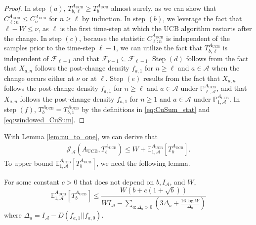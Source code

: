 \documentclass[letterpaper, 10 pt, conference]{ieeeconf}  %
\newcommand{\lp}{\left(}
\newcommand{\rp}{\right)}
\newcommand{\lb}{\left[}
\newcommand{\rb}{\right]}
\newcommand{\mcal}{\mathcal}
\newcommand{\mrm}{\mathrm}
\newcommand{\mbb}{\mathbb}
\newcommand{\E}{\mathbb{E}}
\begin{document}
\begin{proof}
%
In step $(a)$, $T_{b, \ell}^{A_{\mrm{UCB}}} \geq T_{b}^{A_{\mrm{UCB}}}$ almost surely, as we can show that $C_{\ell:n}^{A_{\mrm{UCB}}} \leq C_{n}^{A_{\mrm{UCB}}}$ for $n \geq \ell$ by induction. In step $(b)$, we leverage the fact that $ \ell - W \leq \nu$, as $\ell$ is the first time-step at which the UCB algorithm restarts after the change. In step $(c)$, because the statistic $C_{\ell:n}^{A_{\mrm{UCB}}}$ is independent of the samples prior to the time-step $\ell - 1$, we can utilize the fact that $T_{b, \ell}^{A_{\mrm{UCB}}}$ is independent of $\mcal{F}_{\ell - 1}$ and that $\mcal{F}_{\nu - 1} \subseteq \mcal{F}_{\ell - 1}$. Step $(d)$ follows from the fact that $X_{a,n}$ follows the post-change density $f_{a,1}$ for $n \geq \ell$ and $a \in \mcal{A}$ when the change occurs either at $\nu$ or at $\ell$. Step $(e)$ results from the fact that $X_{a,n}$ follows the post-change density $f_{a,1}$ for $n \geq \ell$ and $a \in \mcal{A}$ under $\mbb{P}_{\ell, \mcal{A}}^{A_{\mrm{UCB}}}$, and that $X_{a,n}$ follows the post-change density $f_{a,1}$ for $n \geq 1$ and $a \in \mcal{A}$ under $\mbb{P}_{1, \mcal{A}}^{A_{\mrm{UCB}}}$. In step $(f)$, $T_{b}^{A_{\mrm{UCB}}}=T_{b, 1}^{A_{\mrm{UCB}}}$ by the definitions in \eqref{eq:CuSum_stat} and \eqref{eq:windowed_CuSum}.
\end{proof}

With Lemma \ref{lem:nu_to_one}, we can derive that
%
\begin{align}
    \mcal{J}_{\mcal{A}} \lp A_{\mrm{UCB}}, T_{b}^{A_{\mrm{UCB}}} \rp \leq W + \E_{1,\mcal{A}}^{A_{\mrm{UCB}}} \lb T_{b}^{A_{\mrm{UCB}}} \rb.
\end{align}
%
To upper bound $\E_{1,\mcal{A}}^{A_{\mrm{UCB}}} \lb T_{b}^{A_{\mrm{UCB}}} \rb$, we need the following lemma.

\begin{lemma}\label{lem:E1_upp_UCB_CuSum}
For some constant $c > 0$ that does not depend on $b, I_{\mcal{A}}$, and $W$,
%
\begin{equation}
    \E_{1,\mcal{A}}^{A_{\mrm{UCB}}} \lb T_{b}^{A_{\mrm{UCB}}} \rb \leq \frac{W \lp b + c \lp 1 + \sqrt{b} \rp \rp}{WI_{\mcal{A}} -  \sum_{a: \Delta_{a} > 0} \lp 3\Delta_{a} + \frac{16 \log W}{\Delta_{a}} \rp}
\end{equation}
%
where $\Delta_{a} = I_{\mcal{A}} - D \lp f_{a,1} || f_{a,0} \rp$.
\end{lemma}
\end{document}
